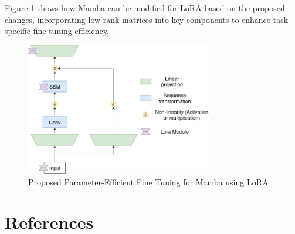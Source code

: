 \documentclass[12pt, conference, compsoc, onecolumn]{IEEEtran}
\begin{document}
	Figure \ref{fig:lora_mamba} shows how Mamba can be modified for LoRA based on the proposed changes, incorporating low-rank matrices into key components to enhance task-specific fine-tuning efficiency, 
	
	\begin{figure}[H]
		\centering
		\includegraphics[width=0.73\textwidth]{figures/lora_mamba.png}
		\caption{Proposed Parameter-Efficient Fine Tuning for Mamba using LoRA}
		\label{fig:lora_mamba}
	\end{figure}
		
	\newpage
		
	\section*{References}
	\printbibliography[heading=none]
	
	
	
\end{document}
